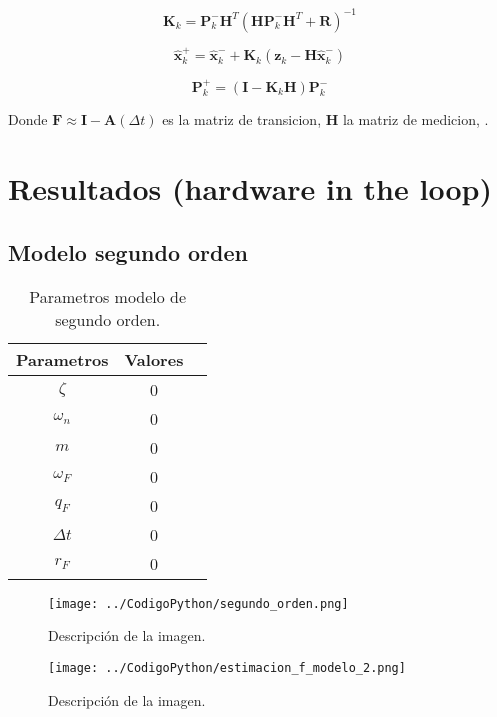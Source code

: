 \documentclass[conference]{IEEEtran}
\begin{document}
\[
\mathbf{K}_k = \mathbf{P}_k^- \mathbf{H}^T \left( \mathbf{H} \mathbf{P}_k^- \mathbf{H}^T + \mathbf{R} \right)^{-1}
\]

\[
\hat{\mathbf{x}}_k^+ = \hat{\mathbf{x}}_k^- + \mathbf{K}_k \left( \mathbf{z}_k - \mathbf{H} \hat{\mathbf{x}}_k^- \right)
\]

\[
\mathbf{P}_k^+ = \left( \mathbf{I} - \mathbf{K}_k \mathbf{H} \right) \mathbf{P}_k^-
\]

Donde $\mathbf{F}\approx \mathbf{I} - \mathbf{A}(\Delta t) $ es la matriz de transicion, $\mathbf{H}$  la matriz de medicion, .





\section{Resultados (hardware in the loop)}

\subsection{Modelo segundo orden}

\begin{table}[h]
	\centering
	\caption{Parametros modelo de segundo orden.}
	\label{tab:parametros_segundo_orden}
	\begin{tabular}{|c|c|c|}
		\hline
		\textbf{Parametros} & \textbf{Valores} \\
		\hline
		$\zeta$  &  0 \\
		$\omega_n$      & 0 \\
		$m$ & 0 \\
		$\omega_F$ & 0 \\
		$ q_F $  &  0\\
		$\Delta t$ & 0\\  
		$r_F$ & 0 \\ 
		\hline
	\end{tabular}
	
\end{table}




\begin{figure}[h]
	\centering
	\texttt{[image: ../CodigoPython/segundo\_orden.png]}
	\caption{Descripción de la imagen.}
	\label{fig:segundo_orden}
\end{figure}

\begin{figure}[h]
	\centering
	\texttt{[image: ../CodigoPython/estimacion\_f\_modelo\_2.png]}
	\caption{Descripción de la imagen.}
	\label{fig:f_modelo_2}
\end{figure}
\end{document}
